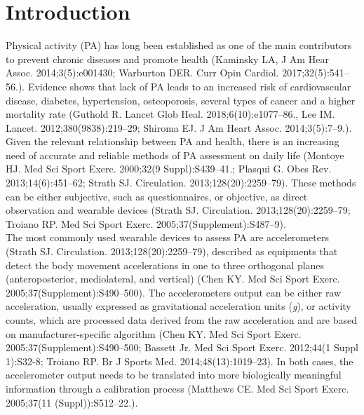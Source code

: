 \documentclass[11pt]{article}
\begin{document}
\section*{Introduction}

Physical activity (PA) has long been established as one of the main contributors to prevent chronic diseases and promote health {\tiny (Kaminsky LA, J Am Hear Assoc. 2014;3(5):e001430; Warburton DER. Curr Opin Cardiol. 2017;32(5):541–56.)}. Evidence shows that lack of PA leads to an increased risk of cardiovascular disease, diabetes, hypertension, osteoporosis, several types of cancer and a higher mortality rate {\tiny (Guthold R. Lancet Glob Heal. 2018;6(10):e1077–86., Lee IM. Lancet. 2012;380(9838):219–29; Shiroma EJ. J Am Heart Assoc. 2014;3(5):7–9.)}. Given the relevant relationship between PA and health, there is an increasing need of accurate and reliable methods of PA assessment on daily life {\tiny (Montoye HJ. Med Sci Sport Exerc. 2000;32(9 Suppl):S439–41.; Plasqui G. Obes Rev. 2013;14(6):451–62; Strath SJ. Circulation. 2013;128(20):2259–79)}. These methods can be either subjective, such as questionnaires, or objective, as direct observation and wearable devices {\tiny (Strath SJ. Circulation. 2013;128(20):2259–79; Troiano RP. Med Sci Sport Exerc. 2005;37(Supplement):S487–9)}. \\

The most commonly used wearable devices to assess PA are accelerometers {\tiny (Strath SJ. Circulation. 2013;128(20):2259–79)}, described as equipments that detect the body movement accelerations in one to three orthogonal planes (anteroposterior, mediolateral, and vertical) {\tiny (Chen KY. Med Sci Sport Exerc. 2005;37(Supplement):S490–500)}. The accelerometers output can be either raw acceleration, usually expressed as gravitational acceleration units (\textit{g}), or activity counts, which are processed data derived from the raw acceleration and are based on manufacturer-specific algorithm {\tiny (Chen KY. Med Sci Sport Exerc. 2005;37(Supplement):S490–500; Bassett  Jr. Med Sci Sport Exerc. 2012;44(1 Suppl 1):S32-8; Troiano RP. Br J Sports Med. 2014;48(13):1019–23)}. In both cases, the accelerometer output needs to be translated into more biologically meaningful information through a calibration process {\tiny (Matthews CE. Med Sci Sport Exerc. 2005;37(11 (Suppl)):S512–22.)}. \\
\end{document}
